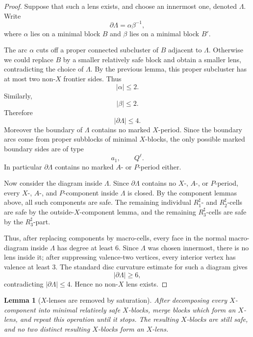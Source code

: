 \documentclass{article}
\newtheorem{lm}[theorem]{Lemma}
\begin{document}
\begin{proof}
Suppose that such a lens exists, and choose an innermost one, denoted
$\Lambda$.  Write
\[
        \partial\Lambda=\alpha\beta^{-1},
\]
where $\alpha$ lies on a minimal block $B$ and $\beta$ lies on a minimal block
$B'$.

The arc $\alpha$ cuts off a proper connected subcluster of $B$ adjacent to
$\Lambda$.  Otherwise we could replace $B$ by a smaller relatively safe block
and obtain a smaller lens, contradicting the choice of $\Lambda$.  By the
previous lemma, this proper subcluster has at most two non-$X$ frontier sides.
Thus
\[
        |\alpha|\leq 2.
\]
Similarly,
\[
        |\beta|\leq 2.
\]
Therefore
\[
        |\partial\Lambda|\leq 4.
\]
Moreover the boundary of $\Lambda$ contains no marked $X$-period.  Since the
boundary arcs come from proper subblocks of minimal $X$-blocks, the only
possible marked boundary sides are of type
\[
        a_1,
        \qquad Q^{\ell}.
\]
In particular $\partial\Lambda$ contains no marked $A$- or $P$-period either.

Now consider the diagram inside $\Lambda$.  Since $\partial\Lambda$ contains
no $X$-, $A$-, or $P$-period, every $X$-, $A$-, and $P$-component inside
$\Lambda$ is closed.  By the component lemmas above, all such components are
safe.  The remaining individual $R_1^{\sharp}$- and $R_2^{\sharp}$-cells are safe by the
outside-$X$-component lemma, and the remaining $R_3^{\sharp}$-cells are safe by the
$R_3^{\sharp}$-part.

Thus, after replacing components by macro-cells, every face in the normal
macro-diagram inside $\Lambda$ has degree at least $6$.  Since $\Lambda$ was
chosen innermost, there is no lens inside it; after suppressing valence-two
vertices, every interior vertex has valence at least $3$.  The standard disc
curvature estimate for such a diagram gives
\[
        |\partial\Lambda|\geq 6,
\]
contradicting $|\partial\Lambda|\leq 4$.  Hence no non-$X$ lens exists.
\end{proof}

\begin{lm}[$X$-lenses are removed by saturation]
After decomposing every $X$-component into minimal relatively safe $X$-blocks,
merge blocks which form an $X$-lens, and repeat this operation until it stops.
The resulting $X$-blocks are still safe, and no two distinct resulting
$X$-blocks form an $X$-lens.
\end{lm}
\end{document}
